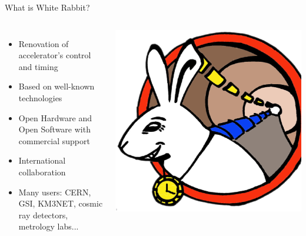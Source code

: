 \documentclass[compress,red]{beamer}
\begin{document}
\begin{frame}{What is White Rabbit?}

\begin{columns}[c]
	  \begin{itemize}
		\item Renovation of accelerator's control and timing
		\item Based on well-known technologies
		\item Open Hardware and Open Software with commercial support
		\item International collaboration
    \item Many users: CERN, GSI, KM3NET, cosmic ray detectors, metrology labs...
	  \end{itemize}
		\begin{center}
		\includegraphics[width=1.0\textwidth]{logo/WRlogo.ps}
		\end{center}
	\end{columns}
\end{frame}
\end{document}
